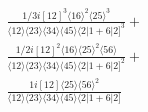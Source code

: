 \documentclass[varwidth, border=5pt]{standalone}
\begin{document}
\begin{my}
$\begin{gathered}
\scriptscriptstyle\frac{1/3i[12]^3\langle16\rangle^2\langle25\rangle^3}{\langle12\rangle\langle23\rangle\langle34\rangle\langle45\rangle\langle2|1+6|2]^3}+\\
\scriptscriptstyle\frac{1/2i[12]^2\langle16\rangle\langle25\rangle^2\langle56\rangle}{\langle12\rangle\langle23\rangle\langle34\rangle\langle45\rangle\langle2|1+6|2]^2}+\\
\scriptscriptstyle\frac{1i[12]\langle25\rangle\langle56\rangle^2}{\langle12\rangle\langle23\rangle\langle34\rangle\langle45\rangle\langle2|1+6|2]}\phantom{+}
\end{gathered}$
\end{my}
\end{document}

